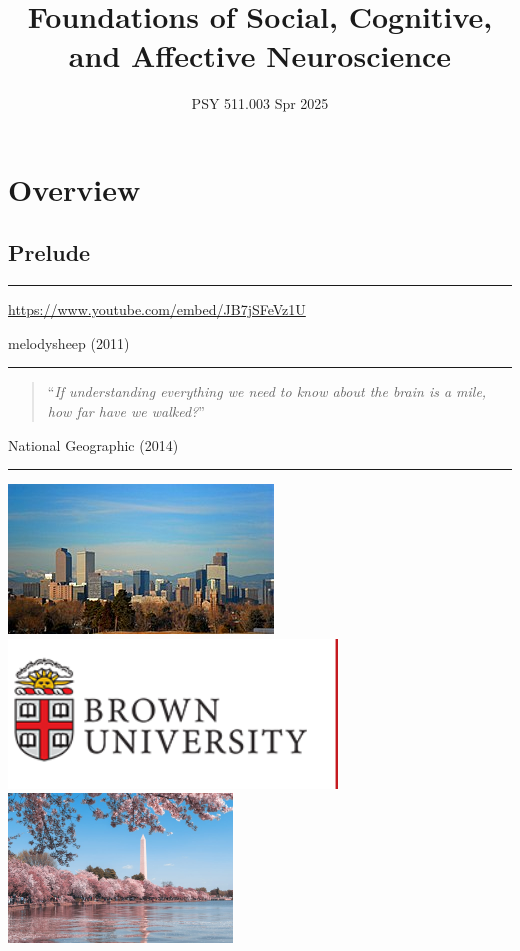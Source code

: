 \documentclass[
  letterpaper,
  DIV=11,
  numbers=noendperiod]{scrartcl}
\title{Foundations of Social, Cognitive, and Affective Neuroscience}
\subtitle{PSY 511.003 Spr 2025}
\author{}
\date{}
\begin{document}
\maketitle


\section{Overview}\label{overview}

\subsection{Prelude}\label{prelude}

\begin{center}\rule{0.5\linewidth}{0.5pt}\end{center}

\url{https://www.youtube.com/embed/JB7jSFeVz1U}

melodysheep (2011)

\begin{center}\rule{0.5\linewidth}{0.5pt}\end{center}

\begin{quote}
``\emph{If understanding everything we need to know about the brain is a
mile, how far have we walked?}''
\end{quote}

National Geographic (2014)

\begin{center}\rule{0.5\linewidth}{0.5pt}\end{center}

\includegraphics[width=\linewidth,height=1.5625in,keepaspectratio]{img_gilmore_bio/266px-DenverCP.JPG}
\includegraphics[width=\linewidth,height=1.5625in,keepaspectratio]{img_gilmore_bio/brown_large.png}
\includegraphics[width=\linewidth,height=1.5625in,keepaspectratio]{img_gilmore_bio/wash-monument.jpeg}
\end{document}

